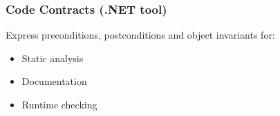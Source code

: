 \begin{frame}
    \frametitle{Code Contracts (.NET tool)}
    Express preconditions, postconditions and object invariants for:
    \begin{itemize}
        \pause \item Static analysis
        \pause \item Documentation
        \pause \item Runtime checking
    \end{itemize}
\end{frame}

